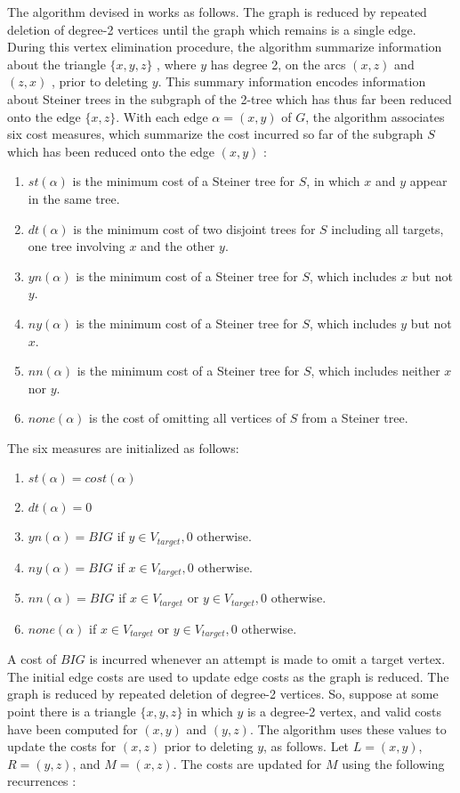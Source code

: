 The algorithm devised in \cite{wald1983steiner} works as follows. The graph is reduced by repeated deletion of degree-2 vertices until the graph which remains is a single edge. During this vertex elimination procedure, the algorithm summarize information about the triangle
$\{ x , y , z \}$ , where $y$ has degree 2, on the arcs $(x,z)$ and $( z , x )$ , prior to deleting $y$. This
summary information encodes information about Steiner trees in the subgraph of the 2-tree which has thus far been reduced onto the edge $\{x, z \}$. With each edge $\alpha = (x, y)$ of $G$, the algorithm associates six cost measures, which summarize the cost incurred so far of the subgraph $S$ which has been reduced onto the edge $(x , y )$ \cite{wald1983steiner}:
\begin{enumerate}[noitemsep]
\item $st(\alpha)$ is the minimum cost of a Steiner tree for $S$, in which $x$ and $y$ appear in the same tree.
\item $dt(\alpha)$ is the minimum cost of two disjoint trees for $S$ including all targets, one tree involving $x$ and the other $y$.
\item  $yn(\alpha)$ is the minimum cost of a Steiner tree for $S$, which includes $x$ but not $y$.
\item $ny(\alpha)$ is the minimum cost of a Steiner tree for $S$, which includes $y$ but not $x$.
\item $nn(\alpha)$ is the minimum cost of a Steiner tree for $S$, which includes neither $x$ nor $y$.
\item $none(\alpha)$ is the cost of omitting all vertices of $S$ from a Steiner tree.
\end{enumerate}
The six measures are initialized as follows:
\begin{enumerate}[noitemsep] 
\item $st(\alpha)=cost(\alpha)$
\item $dt(\alpha)=0$
\item  $yn(\alpha)=BIG$ if $y\in V_{target},0$ otherwise.
\item $ny(\alpha)=BIG$ if $x\in V_{target},0$ otherwise.
\item $nn(\alpha)=BIG$ if $x\in V_{target}$ or $y\in V_{target},0$ otherwise.
\item $none(\alpha)$ if $x\in V_{target}$ or $y\in V_{target},0$ otherwise.
\end{enumerate}
A cost of $BIG$ is incurred whenever an attempt is made to omit a target vertex.
The initial edge costs are used to update edge costs as the graph is reduced. The graph is reduced by repeated deletion of degree-2 vertices. So, suppose at some point there is a triangle $\{ x , y , z \}$ in which $y$ is a degree-2 vertex, and valid costs have been computed for $( x , y )$ and $(y,z)$. The algorithm uses these values to update the costs for $( x , z )$ prior to deleting $y$, as follows. Let $L = (x,y)$, $R = (y , z )$, and $M = ( x , z )$. The costs are updated for $M$ using the following recurrences \cite{wald1983steiner}:

